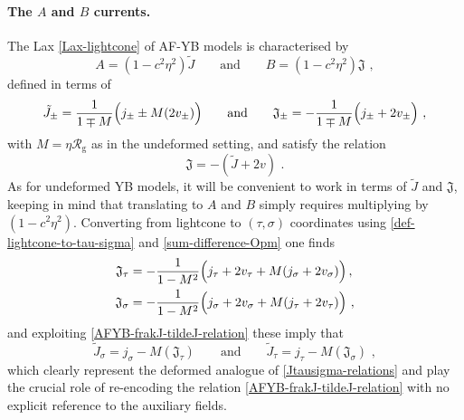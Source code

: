 \documentclass[12pt]{article}
\numberwithin{equation}{section}
\begin{document}
\paragraph{The $A$ and $B$ currents.} The Lax \eqref{Lax-lightcone} of AF-YB models is characterised by
\begin{equation}
A=(1-c^2\eta^2)\tilde{J}
\qquad \text{and} \qquad 
B=(1-c^2\eta^2)\mathfrak{J} \,\, ,
\end{equation} 
defined in terms of 
\begin{equation}
\tilde{J}_{\pm}=\frac{1}{1\mp M}\Bigl( j_{\pm}\pm M(2v_{\pm}) \Bigr)
\qquad \text{and} \qquad 
\mathfrak{J}_{\pm}=-\frac{1}{1\mp M}\Bigl( j_{\pm}+2v_{\pm}  \Bigr) \,\, ,
\end{equation}
with $M=\eta \mathcal{R}_{\mathrm{g}}$ as in the undeformed setting, and satisfy the relation
\begin{equation}\label{AFYB-frakJ-tildeJ-relation}
\mathfrak{J}=-(\tilde{J}+2v) \,\, .
\end{equation}
As for undeformed YB models, it will be convenient to work in terms of $\tilde{J}$ and $\mathfrak{J}$, keeping in mind that translating to $A$ and $B$ simply requires multiplying by $(1-c^2\eta^2)$.
Converting from lightcone to $(\tau,\sigma)$ coordinates using \eqref{def-lightcone-to-tau-sigma} and \eqref{sum-difference-Opm} one finds
\begin{equation}\label{AF-YB-frakJ-tausigma-components}
\begin{aligned}
\mathfrak{J}_{\tau}&=-\frac{1}{1-M^2}\Bigl( j_{\tau}+2v_{\tau}+M(j_{\sigma}+2v_{\sigma}) \Bigr) \, ,
\\
\mathfrak{J}_{\sigma}&=-\frac{1}{1-M^2}\Bigl( j_{\sigma}+2v_{\sigma}+M(j_{\tau}+2v_{\tau}) \Bigr) \,\, ,
\end{aligned}
\end{equation}
and exploiting \eqref{AFYB-frakJ-tildeJ-relation} these imply that
\begin{equation}\label{AF-YB-tildeJ-frakJ-relation}
\tilde{J}_{\sigma}=j_{\sigma}-M(\mathfrak{J}_{\tau})
\qquad \text{and} \qquad 
\tilde{J}_{\tau}=j_{\tau}-M(\mathfrak{J}_{\sigma}) \,\, ,
\end{equation}
which clearly represent the deformed analogue of \eqref{Jtausigma-relations} and play the crucial role of re-encoding the relation \eqref{AFYB-frakJ-tildeJ-relation} with no explicit reference to the auxiliary fields.
\end{document}
